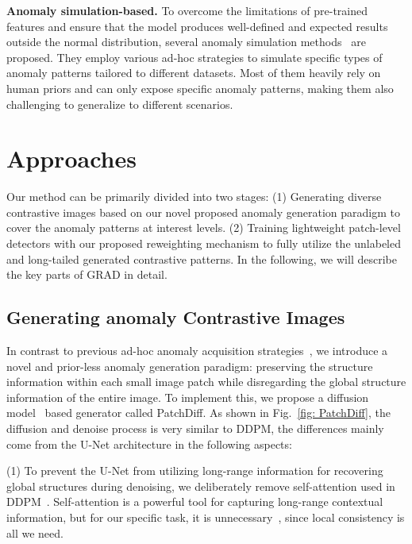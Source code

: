 \documentclass[letterpaper]{article} %
\begin{document}
\noindent\textbf{Anomaly simulation-based.}
To overcome the limitations of pre-trained features and ensure that the model produces well-defined and expected results outside the normal distribution, several anomaly simulation methods~\cite{FCDD, CutPaste, DRAEM, SLSG} are proposed. They employ various ad-hoc strategies to simulate specific types of anomaly patterns tailored to different datasets. Most of them heavily rely on human priors and can only expose specific anomaly patterns, making them also challenging to generalize to different scenarios.


\section{Approaches}

Our method can be primarily divided into two stages: (1) Generating diverse contrastive images based on our novel proposed anomaly generation paradigm to cover the anomaly patterns at interest levels. (2) Training lightweight patch-level detectors with our proposed reweighting mechanism to fully utilize the unlabeled and long-tailed generated contrastive patterns. In the following, we will describe the key parts of GRAD in detail.

\subsection{Generating anomaly Contrastive Images}
\label{sec: generating}

In contrast to previous ad-hoc anomaly acquisition strategies~\cite{CutPaste, DRAEM, SLSG}, we introduce a novel and prior-less anomaly generation paradigm: preserving the structure information within each small image patch while disregarding the global structure information of the entire image. To implement this, we propose a diffusion model~\cite{DDPM} based generator called PatchDiff.
As shown in Fig.~\ref{fig: PatchDiff}, the diffusion and denoise process is very similar to DDPM, the differences mainly come from the U-Net architecture in the following aspects:  

(1) To prevent the U-Net from utilizing long-range information for recovering global structures during denoising, we deliberately remove self-attention used in DDPM~\cite{DDPM}. Self-attention is a powerful tool for capturing long-range contextual information, but for our specific task, it is unnecessary~\cite{AttentionNotNeed}, since local consistency is all we need. 
\end{document}
